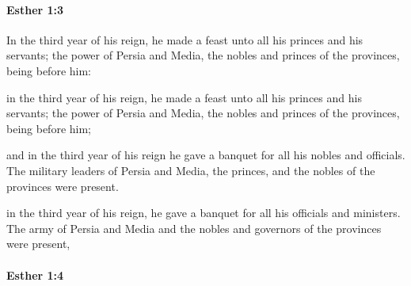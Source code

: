 		\paragraph{Esther 1:3} %
			\label{ESTHER-1-3}

			In the third year of his reign, he made a feast unto all his princes and his servants; the power of Persia and Media, the nobles and princes of the provinces, being before him:

			\begin{versebox}
					\item[BHS] 
					\item[LXX] 
					\item[ASV] in the third year of his reign, he made a feast unto all his princes and his servants; the power of Persia and Media, the nobles and princes of the provinces, being before him;
					\item[NIV] and in the third year of his reign he gave a banquet for all his nobles and officials. The military leaders of Persia and Media, the princes, and the nobles of the provinces were present.
					\item[NRSV] in the third year of his reign, he gave a banquet for all his officials and ministers. The army of Persia and Media and the nobles and governors of the provinces were present,
			\end{versebox}

		\paragraph{Esther 1:4} %
			\label{ESTHER-1-4}

